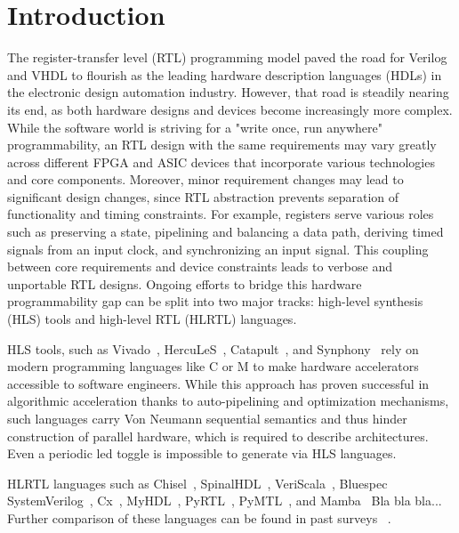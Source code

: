 \section{Introduction}
The register-transfer level (RTL) programming model paved the road for Verilog and VHDL to flourish as the leading hardware description languages (HDLs) in the electronic design automation industry. However, that road is steadily nearing its end, as both hardware designs and devices become increasingly more complex. While the software world is striving for a "write once, run anywhere" programmability, an RTL design with the same requirements may vary greatly across different FPGA and ASIC devices that incorporate various technologies and core components. Moreover, minor requirement changes may lead to significant design changes, since RTL abstraction prevents separation of functionality and timing constraints. For example, registers serve various roles such as preserving a state, pipelining and balancing a data path, deriving timed signals from an input clock, and synchronizing an input signal. This coupling between core requirements and device constraints leads to verbose and unportable RTL designs. Ongoing efforts to bridge this hardware programmability gap can be split into two major tracks: high-level synthesis (HLS) tools and high-level RTL (HLRTL) languages.

HLS tools, such as Vivado~\cite{Vivado2012}, HercuLeS~\cite{Kavvadias2013}, Catapult~\cite{graphics2008catapult}, and Synphony~\cite{?} rely on modern programming languages like C or M to make hardware accelerators accessible to software engineers. While this approach has proven successful in algorithmic acceleration thanks to auto-pipelining and optimization mechanisms, such languages carry Von Neumann sequential semantics and thus hinder construction of parallel hardware, which is required to describe architectures. Even a periodic led toggle is impossible to generate via HLS languages.

HLRTL languages such as Chisel~\cite{Bachrach2012}, SpinalHDL~\cite{Charles2016}, VeriScala~\cite{Liu2017}, Bluespec SystemVerilog~\cite{nikhil2004bluespec}, Cx~\cite{CxLang2014}, MyHDL~\cite{decaluwe2004myhdl}, PyRTL~\cite{Clow2017}, PyMTL~\cite{Lockhart2014}, and Mamba~\cite{jiang2018mamba} Bla bla bla...
Further comparison of these languages can be found in past surveys ~\cite{Kapre2016, Nane2016, Windh2015}.



